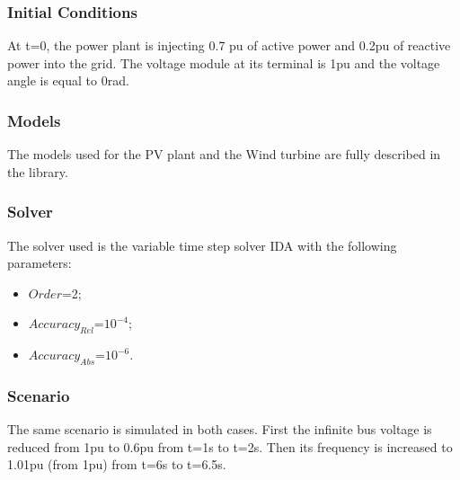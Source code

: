 \documentclass[a4paper, 12pt]{report}
\begin{document}
\subsubsection{Initial Conditions}

\par At t=0, the power plant is injecting 0.7 pu of active power and 0.2pu of reactive power into the grid. The voltage module at its terminal is 1pu and the voltage angle is equal to 0rad.

\subsubsection{Models}

\par The models used for the PV plant and the Wind turbine are fully described in the \Dynawo library.

\subsubsection{Solver}

\par The solver used is the variable time step solver IDA with the following parameters:
\begin{itemize}
\item $Order$=2;
\item $Accuracy_{Rel}$=$10^{-4}$;
\item $Accuracy_{Abs}$=$10^{-6}$.
\end{itemize}

\subsubsection{Scenario}

\par The same scenario is simulated in both cases. First the infinite bus voltage is reduced from 1pu to 0.6pu from t=1s to t=2s. Then its frequency is increased to 1.01pu (from 1pu) from t=6s to t=6.5s.
\end{document}

